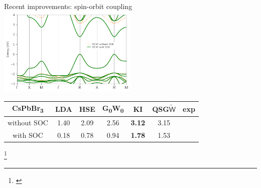 \documentclass[xcolor=table,aspectratio=169]{beamer}
\newcommand\blfootcite[1]{%
  \begingroup
  \renewcommand\thefootnote{}\footnote{\hspace{-4ex}\cite{#1}}%
  \addtocounter{footnote}{-1}%
  \endgroup
}
\numberwithin{equation}{section}
\begin{document}
\begin{frame}{Recent improvements: spin-orbit coupling}
   \centering
   \includegraphics[width=0.5\textwidth]{figures/marrazzo_CsPbBr3_bands.pdf}

   \begin{tabular}{c S[table-format = 2.2] S[table-format = 2.2] S[table-format = 2.2] >{\color{seaborn_red}\bfseries}S[table-format = 2.2] S[table-format = 2.2] S[table-format = 2.2]}
      CsPbBr\textsubscript{3}
                       & {LDA} & {HSE} & {G\textsubscript{0}W\textsubscript{0}} & {KI} & {QSG$\tilde{\mathsf{W}}$} & {exp} \\
      \midrule
      without SOC & 1.40  & 2.09 & 2.56 & 3.12 & 3.15 & {} \\
      with SOC         & 0.18 & 0.78 & 0.94 & 1.78 & 1.53      %
   \end{tabular}
   \blfootcite{Marrazzo2024}

\end{frame}
\end{document}

